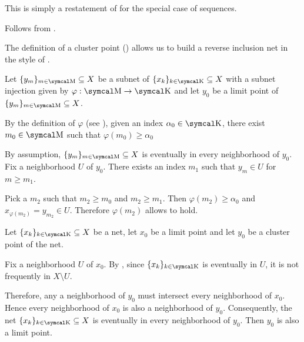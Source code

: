 \begin{RefListProof}
     This is simply a restatement of  for the special case of sequences.

     Follows from .

    \mbox{}
    \begin{RefList}
      \ISufficiency The definition of a cluster point () allows us to build a reverse inclusion net in the style of .

      \INecessity Let \( \{ y_m \}_{m \in \CM} \subseteq X \) be a subnet of \( \{ x_k \}_{k \in \CK} \subseteq X \) with a subnet injection given by \( \varphi: \CM \to \CK \) and let \( y_0 \) be a limit point of \( \{ y_m \}_{m \in \CM} \subseteq X \).

      By the definition of \( \varphi \) (see ), given an index \( \alpha_0 \in \CK \), there exist \( m_0 \in \CM \) such that \( \varphi(m_0) \geq \alpha_0 \)

      By assumption, \( \{ y_m \}_{m \in \CM} \subseteq X \) is eventually in every neighborhood of \( y_0 \). Fix a neighborhood \( U \) of \( y_0 \). There exists an index \( m_1 \) such that \( y_m \in U \) for \( m \geq m_1 \).

      Pick a \( m_2 \) such that \( m_2 \geq m_0 \) and \( m_2 \geq m_1 \). Then \( \varphi(m_2) \geq \alpha_0 \) and \( x_{\varphi(m_2)} = y_{m_2} \in U \). Therefore \( \varphi(m_2) \) allows  to hold.
    \end{RefList}

     Let \( \{ x_k \}_{k \in \CK} \subseteq X \) be a net, let \( x_0 \) be a limit point and let \( y_0 \) be a cluster point of the net.

    Fix a neighborhood \( U \) of \( x_0 \). By , since \( \{ x_k \}_{k \in \CK} \) is eventually in \( U \), it is not frequently in \( X \setminus U \).

    Therefore, any a neighborhood of \( y_0 \) must intersect every neighborhood of \( x_0 \). Hence every neighborhood of \( x_0 \) is also a neighborhood of \( y_0 \). Consequently, the net \( \{ x_k \}_{k \in \CK} \subseteq X \) is eventually in every neighborhood of \( y_0 \). Then \( y_0 \) is also a limit point.


\end{RefListProof}
